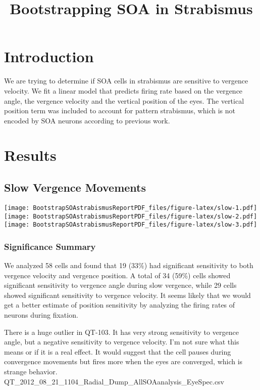 \documentclass[]{article}
\title{Bootstrapping SOA in Strabismus}
\author{}
\date{}
\begin{document}
\maketitle

\section{Introduction}\label{introduction}

We are trying to determine if SOA cells in strabismus are sensitive to
vergence velocity. We fit a linear model that predicts firing rate based
on the vergence angle, the vergence velocity and the vertical position
of the eyes. The vertical position term was included to account for
pattern strabismus, which is not encoded by SOA neurons according to
previous work.

\section{Results}\label{results}

\subsection{Slow Vergence Movements}\label{slow-vergence-movements}

\texttt{[image: BootstrapSOAstrabismusReportPDF\_files/figure-latex/slow-1.pdf]}
\texttt{[image: BootstrapSOAstrabismusReportPDF\_files/figure-latex/slow-2.pdf]}
\texttt{[image: BootstrapSOAstrabismusReportPDF\_files/figure-latex/slow-3.pdf]}

\subsubsection{Significance Summary}\label{significance-summary}

We analyzed 58 cells and found that 19 (33\%) had significant
sensitivity to both vergence velocity and vergence position. A total of
34 (59\%) cells showed significant sensitivity to vergence angle during
slow vergence, while 29 cells showed significant sensitivity to vergence
velocity. It seems likely that we would get a better estimate of
position sensitivity by analyzing the firing rates of neurons during
fixation.

There is a huge outlier in QT-103. It has very strong sensitivity to
vergence angle, but a negative sensitivity to vergence velocity. I'm not
sure what this means or if it is a real effect. It would suggest that
the cell pauses during convergence movements but fires more when the
eyes are converged, which is strange behavior.
QT\_2012\_08\_21\_1104\_Radial\_Dump\_AllSOAanalysis\_EyeSpec.csv
\end{document}
